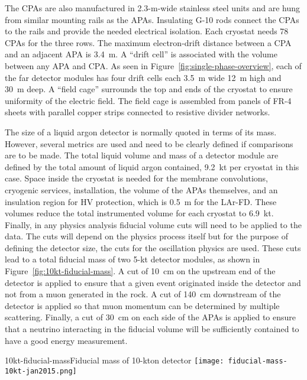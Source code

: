  The CPAs are also manufactured in 2.3-m-wide stainless steel units and are hung from similar mounting rails as the APAs. Insulating G-10 rods connect the CPAs to the rails and provide the needed electrical isolation. Each cryostat  needs 78 CPAs for the three rows.%
 The maximum electron-drift distance between a CPA and an adjacent APA is 3.4~m. A ``drift cell'' is associated with the volume between any APA and CPA. As seen in Figure~\ref{fig:single-phase-overview}, each of the far detector modules has four drift cells each 3.5~m wide 12~m high and 30~m deep.  A ``field cage'' surrounds the top and ends of the cryostat to ensure uniformity of the electric field. The field cage is assembled from panels of FR-4 sheets with parallel copper strips connected to resistive divider networks.

The size of a liquid argon detector is normally %
quoted in terms of its mass. However, several metrics are used and need to be clearly defined if comparisons are to be made. The total liquid volume %
and mass of a detector module  %
are defined by the total amount of liquid argon contained, %
9.2~kt per cryostat in this case. %
Space inside the cryostat is needed for the membrane convolutions, cryogenic services, installation, the volume of the APAs themselves, and an insulation region for HV protection, which is 0.5~m for the LAr-FD. These volumes reduce the total instrumented volume for each %
cryostat to 6.9~kt. Finally, in any physics analysis fiducial volume cuts will need to be applied to the data. The cuts will depend on the physics process itself but for the purpose of defining the detector size, the cuts for the oscillation physics are used. These cuts %
lead to a total fiducial mass of two 5-kt detector modules, as shown in Figure~\ref{fig:10kt-fiducial-mass}. A cut of 10~cm on the upstream end of the detector is applied to ensure that a given event originated inside the detector and not from a muon generated in the rock. A cut of 140~cm downstream of the detector is applied so that muon momentum can be determined by multiple scattering. Finally, a cut of 30~cm on each side of the APAs is applied to ensure that a neutrino interacting in the fiducial volume will be sufficiently contained to have a good energy measurement.

\begin{cdrfigure}{10kt-fiducial-mass}{Fiducial mass of 10-kton detector}
 \texttt{[image: fiducial-mass-10kt-jan2015.png]}
 \end{cdrfigure}

